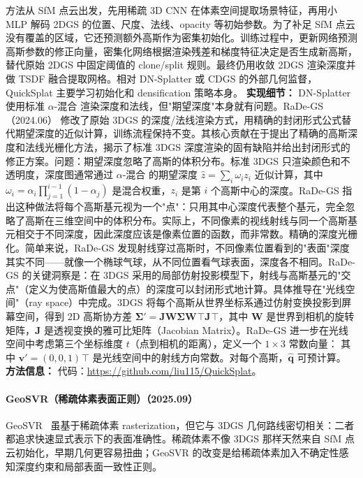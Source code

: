 方法从 SfM 点云出发，先用稀疏 3D CNN 在体素空间提取场景特征，再用小 MLP 解码 2DGS 的位置、尺度、法线、opacity 等初始参数。为了补足 SfM 点云没有覆盖的区域，它还预测额外高斯作为密集初始化。训练过程中，更新网络预测高斯参数的修正向量，密集化网络根据渲染残差和梯度特征决定是否生成新高斯，替代原始 2DGS 中固定阈值的 clone/split 规则。最终仍用收敛 2DGS 渲染深度并做 TSDF 融合提取网格。相对 DN-Splatter 或 CDGS 的外部几何监督，QuickSplat 主要学习初始化和 densification 策略本身。
\textbf{实现细节：} DN-Splatter 使用标准 $\alpha$-混合 渲染深度和法线，但"期望深度"本身就有问题。RaDe-GS（2024.06） 修改了原始 3DGS 的深度/法线渲染方式，用精确的封闭形式公式替代期望深度的近似计算，训练流程保持不变。其核心贡献在于提出了精确的高斯深度和法线光栅化方法，揭示了标准 3DGS 深度渲染的固有缺陷并给出封闭形式的修正方案。问题：期望深度忽略了高斯的体积分布。标准 3DGS 只渲染颜色和不透明度，深度图通常通过 $\alpha$-混合 的期望深度 $\hat{z} = \sum_i \omega_i z_i$ 近似计算，其中 $\omega_i = \alpha_i \prod_{j=1}^{i-1}(1-\alpha_j)$ 是混合权重，$z_i$ 是第 $i$ 个高斯中心的深度。RaDe-GS 指出这种做法将每个高斯基元视为一个"点"：只用其中心深度代表整个基元，完全忽略了高斯在三维空间中的体积分布。实际上，不同像素的视线射线与同一个高斯基元相交于不同深度，因此深度应该是像素位置的函数，而非常数。精确的深度光栅化。简单来说，RaDe-GS 发现射线穿过高斯时，不同像素位置看到的"表面"深度其实不同——就像一个椭球气球，从不同位置看气球表面，深度各不相同。RaDe-GS 的关键洞察是：在 3DGS 采用的局部仿射投影模型下，射线与高斯基元的"交点"（定义为使高斯值最大的点）的深度可以封闭形式地计算。具体推导在"光线空间"（ray space）中完成。3DGS 将每个高斯从世界坐标系通过仿射变换投影到屏幕空间，得到 2D 高斯协方差 $\boldsymbol{\Sigma}' = \mathbf{J}\mathbf{W}\boldsymbol{\Sigma}\mathbf{W}^{}\top\mathbf{J}^{}\top$，其中 $\mathbf{W}$ 是世界到相机的旋转矩阵，$\mathbf{J}$ 是透视变换的雅可比矩阵（Jacobian Matrix）。RaDe-GS 进一步在光线空间中考虑第三个坐标维度 $t$（点到相机的距离），定义一个 $1\times 3$ 常数向量： 其中 $\mathbf{v}'=(0,0,1)^{}\top$ 是光线空间中的射线方向常数。对每个高斯，$\hat{\mathbf{q}}$ 可预计算。
\textbf{方法信息：} 代码：\url{https://github.com/liu115/QuickSplat}。
\paragraph{GeoSVR（稀疏体素表面正则）（2025.09）}
GeoSVR~\cite{2509_18090} 虽基于稀疏体素 rasterization，但它与 3DGS 几何路线密切相关：二者都追求快速显式表示下的表面准确性。稀疏体素不像 3DGS 那样天然来自 SfM 点云初始化，早期几何更容易扭曲；GeoSVR 的改变是给稀疏体素加入不确定性感知深度约束和局部表面一致性正则。

